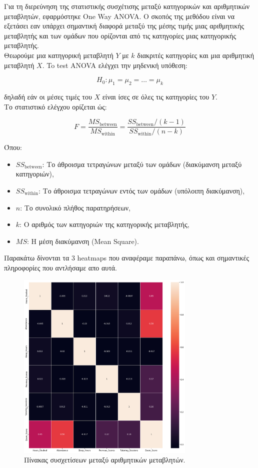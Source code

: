 \documentclass[12pt]{article}
\begin{document}
\noindent Για τη διερεύνηση της στατιστικής συσχέτισης μεταξύ κατηγορικών και αριθμητικών μεταβλητών, εφαρμόστηκε One Way ANOVA. Ο σκοπός της μεθόδου είναι να εξετάσει εαν υπάρχει σημαντική διαφορά μεταξύ της μέσης τιμής μιας αριθμητικής μεταβλητής και των ομάδων που ορίζονται από τις κατηγορίες μιας κατηγορικής μεταβλητής.\\

\noindent Θεωρούμε μια κατηγορική μεταβλητή \( Y \) με \( k \) διακριτές κατηγορίες και μια αριθμητική μεταβλητή \( X \). To test ANOVA ελέγχει την μηδενική υπόθεση:

\[
H_0: \mu_1 = \mu_2 = \dots = \mu_k
\]

\noindent δηλαδή εάν οι μέσες τιμές του \( X \) είναι ίσες σε όλες τις κατηγορίες του \( Y \).\\

\noindent Το στατιστικό ελέγχου ορίζεται ώς: 

\[
F = \frac{MS_{\text{between}}}{MS_{\text{within}}}
= \frac{SS_{\text{between}} / (k - 1)}{SS_{\text{within}} / (n - k)}
\]

\noindent Όπου:
\begin{itemize}
    \item \( SS_{\text{between}} \): Το άθροισμα τετραγώνων μεταξύ των ομάδων (διακύμανση μεταξύ κατηγοριών),
    \item \( SS_{\text{within}} \): Το άθροισμα τετραγώνων εντός των ομάδων (υπόλοιπη διακύμανση),
    \item \( n \): Το συνολικό πλήθος παρατηρήσεων,
    \item \( k \): Ο αριθμός των κατηγοριών της κατηγορικής μεταβλητής,
    \item \( MS \): Η μέση διακύμανση (Mean Square).
\end{itemize}


\noindent Παρακάτω δίνονται τα 3 heatmaps που αναφέραμε παραπάνω, όπως και σημαντικές πληροφορίες που αντλήσαμε απο αυτά.

\begin{figure}
    \centering 
    \includegraphics[width=0.76\textwidth]{./images/arithmetic_relation.png}
    \caption{Πίνακας συσχετίσεων μεταξύ αριθμητικών μεταβλητών.}
    \label{fig:arithmetic_corr}
\end{figure}
\end{document}
